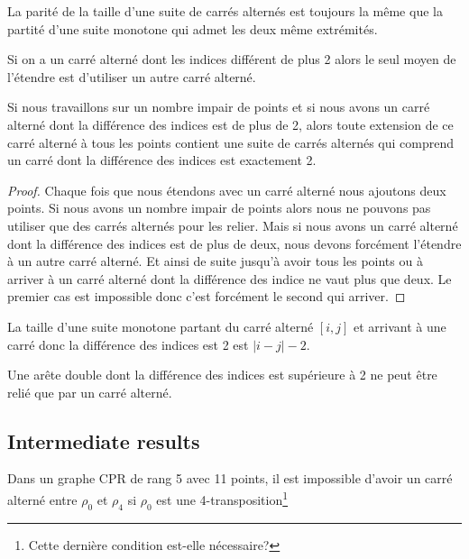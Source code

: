 \begin{lemma}
  La parité de la taille d'une suite de carrés alternés est toujours la même que la partité d'une suite monotone qui admet les deux même extrémités.
\end{lemma}

\begin{lemma}
  Si on a un carré alterné dont les indices différent de plus 2 alors le seul moyen de l'étendre est d'utiliser un autre carré alterné.
\end{lemma}

\begin{corollary}
  Si nous travaillons sur un nombre impair de points et si nous avons un carré alterné dont la différence des indices est de plus de 2, alors toute extension de ce carré alterné à tous les points contient une suite de carrés alternés qui comprend un carré dont la différence des indices est exactement 2.
\end{corollary}

\begin{proof}
  Chaque fois que nous étendons avec un carré alterné nous ajoutons deux points. Si nous avons un nombre impair de points alors nous ne pouvons pas utiliser que des carrés alternés pour les relier. Mais si nous avons un carré alterné dont la différence des indices est de plus de deux, nous devons forcément l'étendre à un autre carré alterné. Et ainsi de suite jusqu'à avoir tous les points ou à arriver à un carré alterné dont la différence des indice ne vaut plus que deux. Le premier cas est impossible donc c'est forcément le second qui arriver.
\end{proof}

\begin{lemma}
  La taille d'une suite monotone partant du carré alterné $[i, j]$ et arrivant à une carré donc la différence des indices est 2 est $|i - j| - 2$.
\end{lemma}

\begin{lemma}
  Une arête double dont la différence des indices est supérieure à 2 ne peut être relié que par un carré alterné.
\end{lemma}

\subsection{Intermediate results}

\begin{lemma}
  Dans un graphe CPR de rang 5 avec 11 points, il est impossible d'avoir un carré alterné entre $\rho_0$ et $\rho_4$ si $\rho_0$ est une 4-transposition\footnote{Cette dernière condition est-elle nécessaire?}
\end{lemma}

